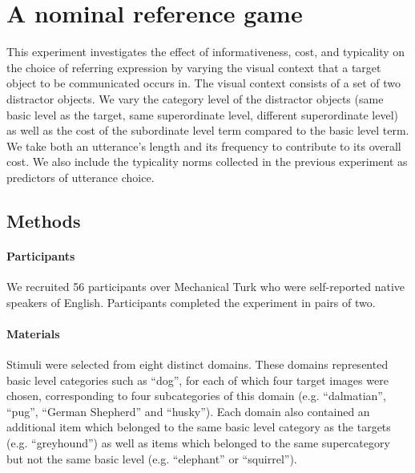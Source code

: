 \documentclass[10pt,letterpaper]{article}
\newcommand{\ndg}[1]{\textcolor{Green}{[ndg: #1]}}
\begin{document}
\section{A nominal reference game}

This experiment investigates the effect of informativeness, cost, and typicality on the choice of referring expression by varying the visual context that a target object to be communicated occurs in. The visual context consists of a set of two distractor objects. We vary the category level of the distractor objects (same basic level as the target, same superordinate level, different superordinate level) as well as the cost of the subordinate level term compared to the basic level term. We take both an utterance's  length and its frequency to contribute to its overall cost. We also include the typicality norms collected in the previous experiment as predictors of utterance choice.


\subsection{\bf Methods}


\paragraph{\bf Participants}
We recruited 56 participants over Mechanical Turk who were self-reported native speakers of English. Participants completed the experiment in pairs of two.

\paragraph{\bf Materials}
Stimuli were selected from eight distinct domains. These domains represented basic level categories such as ``dog'', for each of which four target images were chosen, corresponding to four subcategories of this domain (e.g. ``dalmatian'', ``pug'', ``German Shepherd'' and ``husky''). Each domain also contained an additional item which belonged to the same basic level category as the targets (e.g. ``greyhound'') as well as items which belonged to the same supercategory but not the same basic level (e.g. ``elephant'' or ``squirrel''). 
\end{document}
